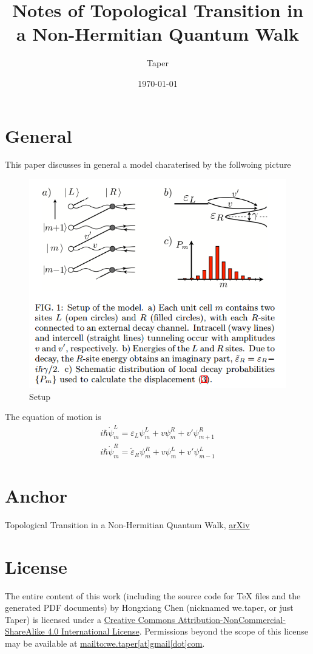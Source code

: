 \documentclass{article}
\title{Notes of Topological Transition in a Non-Hermitian Quantum Walk}
\date{\today}
\author{Taper}
\begin{document}
\maketitle
{}
\tableofcontents
\section{General}
\label{sec:General}
This paper discusses in general a model charaterised by the follwoing
picture
\begin{figure}[H]
    \centering
    \includegraphics[width=0.8\linewidth]{pics/setup.PNG}
    \caption{Setup}
\end{figure}
The equation of motion is
\begin{align}
    i\hbar \dot{\psi}^L_m = \varepsilon_L\psi^L_m + v\psi^R_m
    +v'\psi^R_{m+1} \\
    i\hbar \dot{\psi}^R_m = \tilde{\varepsilon}_R\psi^R_m + v\psi^L_m
    +v'\psi^L_{m-1}
\end{align}
\section{Anchor}
\label{sec:Anchor}

\begin{thebibliography}{1}
     Topological Transition in a Non-Hermitian Quantum
    Walk,
    \href{https://arxiv.org/ct?url=http%3A%2F%2Fdx.doi.org%2F10%252E1103%2FPhysRevLett%252E102%252E065703&v=f6968ad6}{arXiv}
\end{thebibliography}
\printnomenclature
\section{License}
The entire content of this work (including the source code
for TeX files and the generated PDF documents) by 
Hongxiang Chen (nicknamed we.taper, or just Taper) is
licensed under a 
\href{http://creativecommons.org/licenses/by-nc-sa/4.0/}{Creative 
Commons Attribution-NonCommercial-ShareAlike 4.0 International 
License}. Permissions beyond the scope of this 
license may be available at \url{mailto:we.taper[at]gmail[dot]com}.
\end{document}
